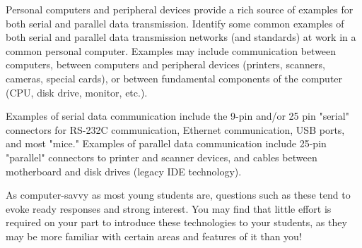 

Personal computers and peripheral devices provide a rich source of examples for both serial and parallel data transmission.  Identify some common examples of both serial and parallel data transmission networks (and standards) at work in a common personal computer.  Examples may include communication between computers, between computers and peripheral devices (printers, scanners, cameras, special cards), or between fundamental components of the computer (CPU, disk drive, monitor, etc.).







Examples of serial data communication include the 9-pin and/or 25 pin "serial" connectors for RS-232C communication, Ethernet communication, USB ports, and most "mice."  Examples of parallel data communication include 25-pin "parallel" connectors to printer and scanner devices, and cables between motherboard and disk drives (legacy IDE technology).







As computer-savvy as most young students are, questions such as these tend to evoke ready responses and strong interest.  You may find that little effort is required on your part to introduce these technologies to your students, as they may be more familiar with certain areas and features of it than you!




